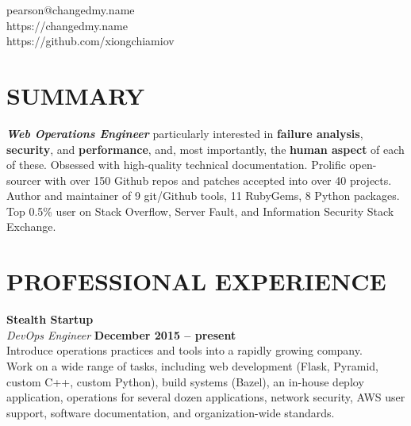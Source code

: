 \documentclass[margin,line]{resume}
\begin{document}
{
    \hfill pearson@changedmy.name           \vspace{0mm}\\\vspace{0mm}%
    \hfill https://changedmy.name           \vspace{0mm}\\\vspace{0mm}%
    \hfill https://github.com/xiongchiamiov \vspace{0mm}\\\vspace{-9mm}%
}

\begin{resume}

    \vspace{-3mm}

    \section{\mysidestyle \textbf{\large{S}\small{UMMARY}}}

    \textbf{\textsl{Web Operations Engineer}} particularly interested in \textbf{failure analysis}, \textbf{security}, and \textbf{performance}, and, most importantly, the \textbf{human aspect} of each of these.  Obsessed with high-quality technical documentation.  Prolific open-sourcer with over 150 Github repos and patches accepted into over 40 projects.  Author and maintainer of 9 git/Github tools, 11 RubyGems, 8 Python packages.  Top 0.5\% user on Stack Overflow, Server Fault, and Information Security Stack Exchange.

    \vspace{-1mm}

\sectionline

    \section{\mysidestyle \textbf{\large{P}\small{ROFESSIONAL} \large{E}\small{XPERIENCE}}}

    \textbf{\listing Stealth Startup} \vspace{2mm}\\\vspace{1mm}%
    \textsl{DevOps Engineer} \hfill \textbf{December 2015 -- present}\\
    Introduce operations practices and tools into a rapidly growing company.\\
    Work on a wide range of tasks, including web development (Flask, Pyramid, custom C++, custom Python), build systems (Bazel), an in-house deploy application, operations for several dozen applications, network security, AWS user support, software documentation, and organization-wide standards.


\end{resume}
\end{document}
